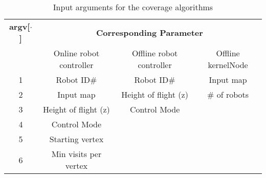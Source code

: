 \begin{table}[h]
\centering
\begin{tabular}{@{}cccc@{}}
\toprule
\textbf{argv{[}$\cdot${]}} & \multicolumn{3}{c}{\textbf{Corresponding Parameter}}                                                                   \\ \cmidrule(l){2-4} 
            & Online robot controller    & Offline robot controller      & Offline kernelNode        \\ \midrule
1           & Robot ID\#                   &   Robot ID\#                     & Input map          \\
2           & Input map                    & Height of flight (z)             & \# of robots         \\
3           & Height of flight (z)         & Control Mode                    &                           \\
4           & Control Mode                &                                       &                           \\
5           & Starting vertex              &                                        &                           \\
6           & Min visits per vertex      &                                        &                           \\ \bottomrule
\end{tabular}
\caption{Input arguments for the coverage algorithms}
\label{tab:inputArgs}
\end{table}
